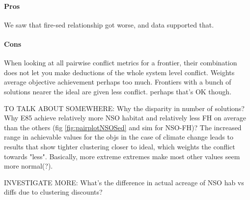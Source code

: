 \paragraph{Pros}
We saw that fire-sed relationship got worse, and data supported that.

\paragraph{Cons}
When looking at all pairwise conflict metrics for a frontier, their combination does not let you make deductions of the whole system level conflict.
Weights average objective achievement perhaps too much. Frontiers with a bunch of solutions nearer the ideal are given less conflict. perhaps that's OK though.


TO TALK ABOUT SOMEWHERE:
Why the disparity in number of solutions?
Why E85 achieve relatively more NSO habitat and relatively less FH on average than the others (fig \ref{fig:pairplotNSOSed} and sim for NSO-FH)?
The increased range in achievable values for the objs in the case of climate change leads to results that show tighter clustering closer to ideal, which weights the conflict towards "less". Basically, more extreme extremes make most other values seem more normal(?).

INVESTIGATE MORE:
What's the difference in actual acreage of NSO hab vs diffs due to clustering discounts?